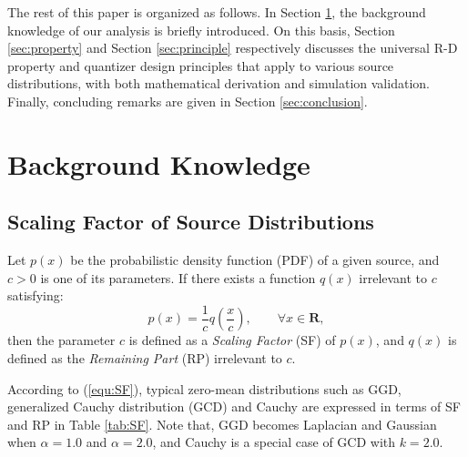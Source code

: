 \documentclass[smallabstract,smallcaptions]{dccpaper}
\begin{document}
The rest of this paper is organized as follows. In Section \ref{sec:background}, the background knowledge of our analysis is briefly introduced. On this basis, Section \ref{sec:property} and Section \ref{sec:principle} respectively discusses the universal R-D property and quantizer design principles that apply to various source distributions, with both mathematical derivation and simulation validation. Finally, concluding remarks are given in Section \ref{sec:conclusion}.

\section{Background Knowledge}
\label{sec:background}

\subsection{Scaling Factor of Source Distributions}

Let $p(x)$ be the probabilistic density function (PDF) of a given source, and $c>0$ is one of its parameters. If there exists a function $q(x)$ irrelevant to $c$ satisfying:
\begin{equation}
\label{equ:SF}
p(x)=\frac{1}{c} q(\frac{x}{c}),\qquad \forall x \in \mathbf{R},
\end{equation}
then the parameter $c$ is defined as a \emph{Scaling Factor} (SF) of $p(x)$, and $q(x)$ is defined as the \emph{Remaining Part} (RP) irrelevant to $c$.

According to (\ref{equ:SF}), typical zero-mean distributions such as GGD, generalized Cauchy distribution (GCD) and Cauchy are expressed in terms of SF and RP in Table \ref{tab:SF}. Note that, GGD becomes Laplacian and Gaussian when $\alpha=1.0$ and $\alpha=2.0$, and Cauchy is a special case of GCD with $k=2.0$.
\end{document}
